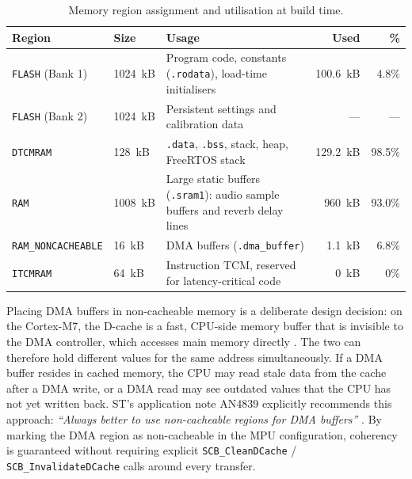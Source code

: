 \begin{table}[H]
	\centering
	\begin{tabular}{llp{4.5cm}rr}
		\toprule
		\textbf{Region} & \textbf{Size} & \textbf{Usage} & \textbf{Used} & \textbf{\%} \\
		\midrule
		\texttt{FLASH} (Bank 1)      & \qty{1024}{kB} & Program code, constants (\texttt{.rodata}), load-time initialisers & \qty{100.6}{kB} & 4.8\% \\
		\texttt{FLASH} (Bank 2)      & \qty{1024}{kB} & Persistent settings and calibration data & --- & --- \\
		\texttt{DTCMRAM}             & \qty{128}{kB}  & \texttt{.data}, \texttt{.bss}, stack, heap, FreeRTOS stack & \qty{129.2}{kB} & 98.5\% \\
		\texttt{RAM}                 & \qty{1008}{kB} & Large static buffers (\texttt{.sram1}): audio sample buffers and reverb delay lines & \qty{960}{kB} & 93.0\% \\
		\texttt{RAM\_NONCACHEABLE}   & \qty{16}{kB}   & DMA buffers (\texttt{.dma\_buffer}) & \qty{1.1}{kB} & 6.8\% \\
		\texttt{ITCMRAM}             & \qty{64}{kB}   & Instruction \ac{TCM}, reserved for latency-critical code & \qty{0}{kB} & 0\% \\
		\bottomrule
	\end{tabular}
	\caption{Memory region assignment and utilisation at build time.}
	\label{tab:memory_layout}
\end{table}

%

Placing DMA buffers in non-cacheable memory is a deliberate design decision: on the Cortex-M7, the D-cache is a fast, CPU-side memory buffer that is invisible to the DMA controller, which accesses main memory directly \cite{ArmCortexM7Processor}. 
The two can therefore hold different values for the same address simultaneously.
If a DMA buffer resides in cached memory, the CPU may read stale data from the cache after a DMA write, or a 
DMA read may see outdated values that the CPU has not yet written back. 
ST's application note AN4839 explicitly recommends this approach: 
\textit{``Always better to use non-cacheable regions for DMA buffers''} \cite[pp.~6-7]{stmicroelectronicsLevel1Cache2018}. 
By marking the DMA region as non-cacheable in the MPU configuration, coherency is guaranteed without requiring explicit \texttt{SCB\_CleanDCache} / \texttt{SCB\_InvalidateDCache} calls around every transfer. \\

